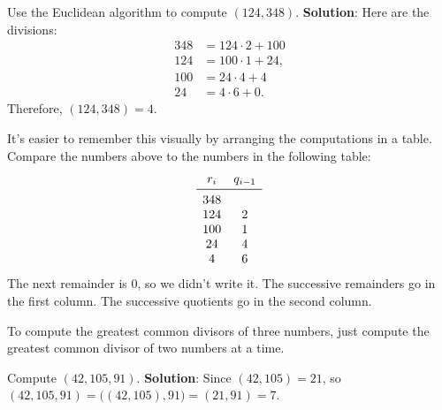 \begin{Example}{}{}
    Use the Euclidean algorithm to compute $ (124,348) $.
    \tcblower{}
    \textbf{Solution}: Here are the divisions:
    \begin{align*}
        348 & = 124\cdot 2+100 \\
        124 & =100\cdot 1+24,  \\
        100 & =24\cdot 4+4     \\
        24  & =4\cdot 6+0.
    \end{align*}
    Therefore, $ (124,348)=4 $.

    It's easier to remember this visually by arranging the computations in a table.
    Compare the numbers above to the numbers in the following table:
    \[ \begin{array}{cc}
            r_i & q_{i-1} \\
            \midrule
            348           \\
            124 & 2       \\
            100 & 1       \\
            24  & 4       \\
            4   & 6
        \end{array} \]
    The next remainder is 0, so we didn't write it. The successive remainders go in the
    first column. The successive quotients go in the second column.
\end{Example}
To compute the greatest common divisors of three numbers, just compute the
greatest common divisor of two numbers at a time.
\begin{Example}{}{}
    Compute $ (42,105,91) $.
    \tcblower{}
    \textbf{Solution}: Since $ (42,105)=21 $, so $ (42,105,91)=\bigl((42,105),91\bigr)=(21,91)=7 $.
\end{Example}
